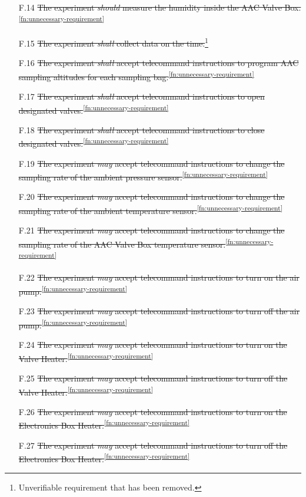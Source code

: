 \documentclass[a4paper,12pt,oneside]{article}
\begin{document}
\begin{appendices}
\begin{enumerate}
    \item[F.14] \st{The experiment \textit{should} measure the humidity inside the AAC Valve Box.}\textsuperscript{\ref{fn:unnecessary-requirement}}
    \item[F.15] \st{The experiment \textit{shall} collect data on the time.}\footnote{Unverifiable requirement that has been removed.\label{fn:unverifiable-requirement}}
    \item[F.16] \st{The experiment \textit{shall} accept telecommand instructions to program AAC sampling altitudes for each sampling bag.}\textsuperscript{\ref{fn:unnecessary-requirement}}
    \item[F.17] \st{The experiment \textit{shall} accept telecommand instructions to open designated valves.}\textsuperscript{\ref{fn:unnecessary-requirement}}
    \item[F.18] \st{The experiment \textit{shall} accept telecommand instructions to close designated valves.}\textsuperscript{\ref{fn:unnecessary-requirement}}
    \item[F.19] \st{The experiment \textit{may} accept telecommand instructions to change the sampling rate of the ambient pressure sensor.}\textsuperscript{\ref{fn:unnecessary-requirement}}
    \item[F.20] \st{The experiment \textit{may} accept telecommand instructions to change the sampling rate of the ambient temperature sensor.}\textsuperscript{\ref{fn:unnecessary-requirement}}
    \item[F.21] \st{The experiment \textit{may} accept telecommand instructions to change the sampling rate of the AAC Valve Box temperature sensor.}\textsuperscript{\ref{fn:unnecessary-requirement}}
    \item[F.22] \st{The experiment \textit{may} accept telecommand instructions to turn on the air pump.}\textsuperscript{\ref{fn:unnecessary-requirement}}
    \item[F.23] \st{The experiment \textit{may} accept telecommand instructions to turn off the air pump.}\textsuperscript{\ref{fn:unnecessary-requirement}}
    \item[F.24] \st{The experiment \textit{may} accept telecommand instructions to turn on the Valve Heater.}\textsuperscript{\ref{fn:unnecessary-requirement}}
    \item[F.25] \st{The experiment \textit{may} accept telecommand instructions to turn off the Valve Heater.}\textsuperscript{\ref{fn:unnecessary-requirement}}
    \item[F.26] \st{The experiment \textit{may} accept telecommand instructions to turn on the Electronics Box Heater.}\textsuperscript{\ref{fn:unnecessary-requirement}}
    \item[F.27] \st{The experiment \textit{may} accept telecommand instructions to turn off the Electronics Box Heater.}\textsuperscript{\ref{fn:unnecessary-requirement}}
\end{enumerate}


\end{appendices}
\end{document}

